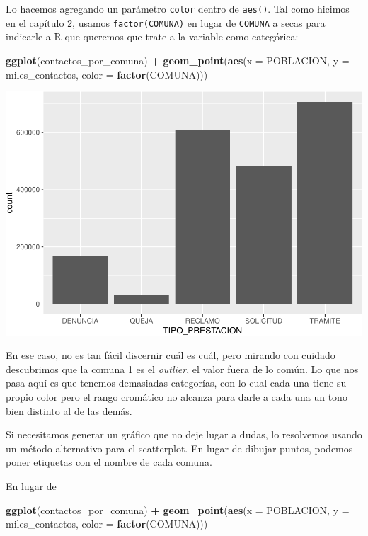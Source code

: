 \documentclass[]{book}
\newenvironment{Shaded}{\begin{snugshade}}{\end{snugshade}}
\newcommand{\KeywordTok}[1]{\textcolor[rgb]{0.13,0.29,0.53}{\textbf{#1}}}
\newcommand{\DataTypeTok}[1]{\textcolor[rgb]{0.13,0.29,0.53}{#1}}
\newcommand{\StringTok}[1]{\textcolor[rgb]{0.31,0.60,0.02}{#1}}
\newcommand{\OperatorTok}[1]{\textcolor[rgb]{0.81,0.36,0.00}{\textbf{#1}}}
\newcommand{\NormalTok}[1]{#1}
\begin{document}
Lo hacemos agregando un parámetro \texttt{color} dentro de
\texttt{aes()}. Tal como hicimos en el capítulo 2, usamos
\texttt{factor(COMUNA)} en lugar de \texttt{COMUNA} a secas para
indicarle a R que queremos que trate a la variable como categórica:

\begin{Shaded}
\begin{Highlighting}[]
\KeywordTok{ggplot}\NormalTok{(contactos_por_comuna) }\OperatorTok{+}\StringTok{ }
\StringTok{    }\KeywordTok{geom_point}\NormalTok{(}\KeywordTok{aes}\NormalTok{(}\DataTypeTok{x =}\NormalTok{ POBLACION, }\DataTypeTok{y =}\NormalTok{ miles_contactos, }\DataTypeTok{color =} \KeywordTok{factor}\NormalTok{(COMUNA)))}
\end{Highlighting}
\end{Shaded}

\includegraphics{ciencia_de_datos_politicas_publicas_files/figure-latex/unnamed-chunk-80-1.pdf}

En ese caso, no es tan fácil discernir cuál es cuál, pero mirando con
cuidado descubrimos que la comuna 1 es el \emph{outlier}, el valor fuera
de lo común. Lo que nos pasa aquí es que tenemos demasiadas categorías,
con lo cual cada una tiene su propio color pero el rango cromático no
alcanza para darle a cada una un tono bien distinto al de las demás.

Si necesitamos generar un gráfico que no deje lugar a dudas, lo
resolvemos usando un método alternativo para el scatterplot. En lugar de
dibujar puntos, podemos poner etiquetas con el nombre de cada comuna.

En lugar de

\begin{Shaded}
\begin{Highlighting}[]
\KeywordTok{ggplot}\NormalTok{(contactos_por_comuna) }\OperatorTok{+}\StringTok{ }
\StringTok{    }\KeywordTok{geom_point}\NormalTok{(}\KeywordTok{aes}\NormalTok{(}\DataTypeTok{x =}\NormalTok{ POBLACION, }\DataTypeTok{y =}\NormalTok{ miles_contactos, }\DataTypeTok{color =} \KeywordTok{factor}\NormalTok{(COMUNA)))}
\end{Highlighting}
\end{Shaded}
\end{document}

